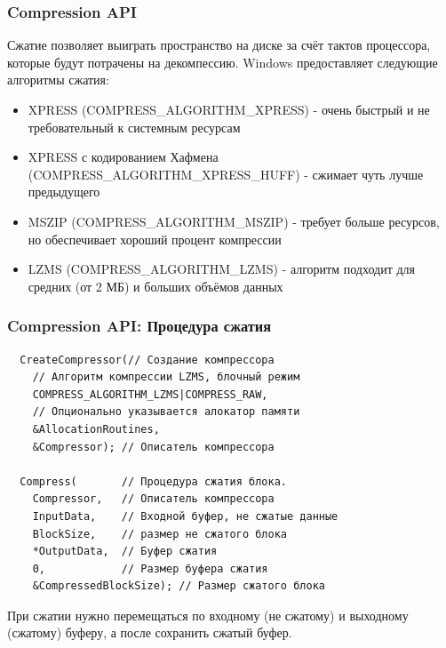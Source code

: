 \documentclass{beamer}
\begin{document}
\begin{frame}
\frametitle{Compression API}

Сжатие позволяет выиграть пространство на диске за счёт тактов процессора, которые будут потрачены на декомпессию. Windows предоставляет следующие алгоритмы сжатия:

\begin{itemize}
\item XPRESS (COMPRESS\_ALGORITHM\_XPRESS) - очень быстрый и не требовательный к системным ресурсам
\item XPRESS с кодированием Хафмена (COMPRESS\_ALGORITHM\_XPRESS\_HUFF) - сжимает чуть лучше предыдущего
\item MSZIP (COMPRESS\_ALGORITHM\_MSZIP) - требует больше ресурсов, но обеспечивает хороший процент компрессии
\item LZMS (COMPRESS\_ALGORITHM\_LZMS) - алгоритм подходит для средних (от 2 МБ) и больших объёмов данных
\end{itemize}

\end{frame}


\begin{frame}[fragile]
\frametitle{Compression API: Процедура сжатия}

\begin{verbatim}
  CreateCompressor(// Создание компрессора
    // Алгоритм компрессии LZMS, блочный режим
    COMPRESS_ALGORITHM_LZMS|COMPRESS_RAW,
    // Опционально указывается алокатор памяти
    &AllocationRoutines,                    
    &Compressor); // Описатель компрессора

  Compress(       // Процедура сжатия блока.
    Compressor,   // Описатель компрессора
    InputData,    // Входной буфер, не сжатые данные
    BlockSize,    // размер не сжатого блока
    *OutputData,  // Буфер сжатия
    0,            // Размер буфера сжатия
    &CompressedBlockSize); // Размер сжатого блока
\end{verbatim}

При сжатии нужно перемещаться по входному (не сжатому) и выходному (сжатому) буферу, а после сохранить сжатый буфер.

\end{frame}

\end{document}
